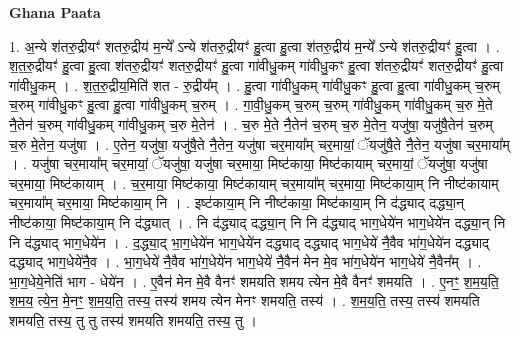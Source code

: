 \documentclass[17pt]{extarticle}
\begin{document}
\textbf{Ghana Paata } \newline

1. अ॒न्ये श॑तरु॒द्रीयꣳ॑ शतरु॒द्रीय॑ म॒न्ये᳚ ऽन्ये श॑तरु॒द्रीयꣳ॑ हु॒त्वा हु॒त्वा श॑तरु॒द्रीय॑ म॒न्ये᳚ ऽन्ये श॑तरु॒द्रीयꣳ॑ हु॒त्वा । . श॒त॒रु॒द्रीयꣳ॑ हु॒त्वा हु॒त्वा श॑तरु॒द्रीयꣳ॑ शतरु॒द्रीयꣳ॑ हु॒त्वा गा॑वीधु॒कम् गा॑वीधु॒कꣳ हु॒त्वा श॑तरु॒द्रीयꣳ॑ शतरु॒द्रीयꣳ॑ हु॒त्वा गा॑वीधु॒कम् । . श॒त॒रु॒द्रीय॒मिति॑ शत - रु॒द्रीय᳚म् । . हु॒त्वा गा॑वीधु॒कम् गा॑वीधु॒कꣳ हु॒त्वा हु॒त्वा गा॑वीधु॒कम् च॒रुम् च॒रुम् गा॑वीधु॒कꣳ हु॒त्वा हु॒त्वा गा॑वीधु॒कम् च॒रुम् । . गा॒वी॒धु॒कम् च॒रुम् च॒रुम् गा॑वीधु॒कम् गा॑वीधु॒कम् च॒रु मे॒ते नै॒तेन॑ च॒रुम् गा॑वीधु॒कम् गा॑वीधु॒कम् च॒रु मे॒तेन॑ । . च॒रु मे॒ते नै॒तेन॑ च॒रुम् च॒रु मे॒तेन॒ यजु॑षा॒ यजु॑षै॒तेन॑ च॒रुम् च॒रु मे॒तेन॒ यजु॑षा । . ए॒तेन॒ यजु॑षा॒ यजु॑षै॒ते नै॒तेन॒ यजु॑षा चर॒माया᳚म् चर॒मायां॒ ॅयजु॑षै॒ते नै॒तेन॒ यजु॑षा चर॒माया᳚म् । . यजु॑षा चर॒माया᳚म् चर॒मायां॒ ॅयजु॑षा॒ यजु॑षा चर॒माया॒ मिष्ट॑काया॒ मिष्ट॑कायाम् चर॒मायां॒ ॅयजु॑षा॒ यजु॑षा चर॒माया॒ मिष्ट॑कायाम् । . च॒र॒माया॒ मिष्ट॑काया॒ मिष्ट॑कायाम् चर॒माया᳚म् चर॒माया॒ मिष्ट॑काया॒म् नि नीष्ट॑कायाम् चर॒माया᳚म् चर॒माया॒ मिष्ट॑काया॒म् नि । . इष्ट॑काया॒म् नि नीष्ट॑काया॒ मिष्ट॑काया॒म् नि द॑द्ध्याद् दद्ध्या॒न् नीष्ट॑काया॒ मिष्ट॑काया॒म् नि द॑द्ध्यात् । . नि द॑द्ध्याद् दद्ध्या॒न् नि नि द॑द्ध्याद् भाग॒धेये॑न भाग॒धेये॑न दद्ध्या॒न् नि नि द॑द्ध्याद् भाग॒धेये॑न । . द॒द्ध्या॒द् भा॒ग॒धेये॑न भाग॒धेये॑न दद्ध्याद् दद्ध्याद् भाग॒धेये॑ नै॒वैव भा॑ग॒धेये॑न दद्ध्याद् दद्ध्याद् भाग॒धेये॑नै॒व । . भा॒ग॒धेये॑ नै॒वैव भा॑ग॒धेये॑न भाग॒धेये॑ नै॒वैन॑ मेन मे॒व भा॑ग॒धेये॑न भाग॒धेये॑
नै॒वैन᳚म् । . भा॒ग॒धेये॒नेति॑ भाग - धेये॑न । . ए॒वैन॑ मेन मे॒वै वैनꣳ॑ शमयति शमय त्येन मे॒वै वैनꣳ॑ शमयति । . ए॒नꣳ॒॒ श॒म॒य॒ति॒ श॒म॒य॒ त्ये॒न॒ मे॒नꣳ॒॒ श॒म॒य॒ति॒ तस्य॒ तस्य॑ शमय त्येन मेनꣳ शमयति॒ तस्य॑ । . श॒म॒य॒ति॒ तस्य॒ तस्य॑ शमयति शमयति॒ तस्य॒ तु तु तस्य॑ शमयति शमयति॒ तस्य॒ तु । \newline
\end{document}
